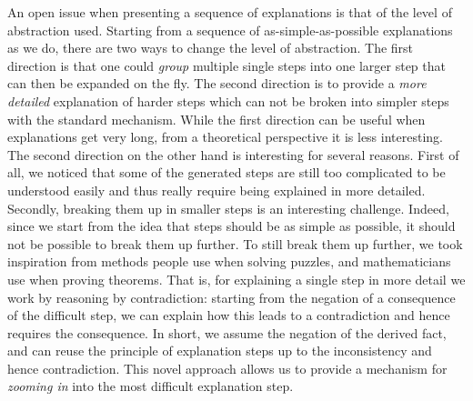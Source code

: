 


An open issue when presenting a sequence of explanations is that of the level of abstraction used.
Starting from a sequence of as-simple-as-possible explanations as we do, there are two ways to change the level of abstraction.
The first direction is that one could \emph{group} multiple single steps into one larger step that can then be expanded on the fly. 
The second direction is to provide a \emph{more detailed} explanation of harder steps which can not be broken into simpler steps with the standard mechanism.
While the first direction can be useful when explanations get very long, from a theoretical perspective it is less interesting. 
The second direction on the other hand is interesting for several reasons. First of all, we noticed that some of the generated steps are still too complicated to be understood easily and thus really require being explained in more detailed. Secondly, breaking them up in smaller steps is an interesting challenge. Indeed, since we start from the idea that steps should be as simple as possible, it should not be possible to break them up further. 
To still break them up further, we took inspiration from methods people use when solving puzzles, and mathematicians use when proving theorems. 
That is, for explaining a single step in more detail we work by reasoning by contradiction: starting from the negation of a consequence of the difficult step, we can explain how this leads to a contradiction and hence requires the consequence. In short, we assume the negation of the derived fact, and can reuse the principle of explanation steps up to the inconsistency and hence contradiction. 
This novel approach allows us to provide a mechanism for \emph{zooming in} into the most difficult explanation step.






